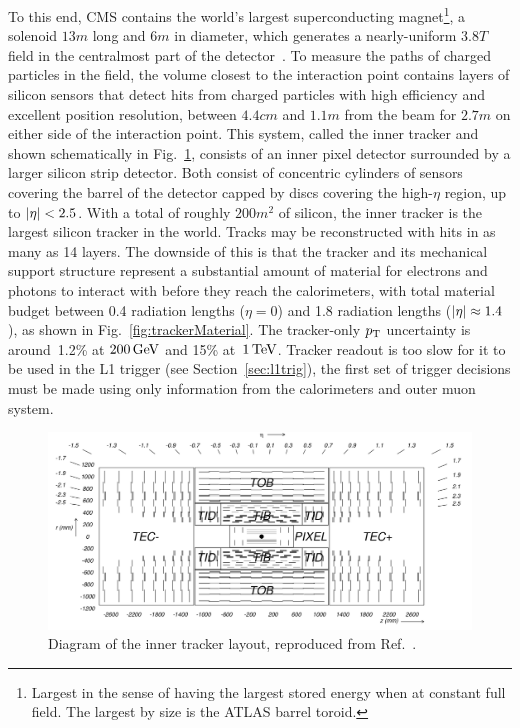 To this end, CMS contains the world's largest superconducting magnet\footnote{Largest in the sense of having the largest stored energy when at constant full field. The largest by size is the ATLAS barrel toroid.}, a solenoid $13\unit{m}$ long and $6\unit{m}$ in diameter, which generates a nearly-uniform $3.8\unit{T}$ field in the centralmost part of the detector~\cite{Campi:magnetTDR}.
To measure the paths of charged particles in the field, the volume closest to the interaction point contains layers of silicon sensors that detect hits from charged particles with high efficiency and excellent position resolution, between $4.4\unit{cm}$ and $1.1\unit{m}$ from the beam for $2.7\unit{m}$ on either side of the interaction point.
This system, called the inner tracker and shown schematically in Fig.~\ref{fig:tracker}, consists of an inner pixel detector surrounded by a larger silicon strip detector.
Both consist of concentric cylinders of sensors covering the barrel of the detector capped by discs covering the high-$\eta$ region, up to $\lvert \eta \rvert < 2.5$.
With a total of roughly $200\unit{m}^2$ of silicon, the inner tracker is the largest silicon tracker in the world.
Tracks may be reconstructed with hits in as many as 14 layers.
The downside of this is that the tracker and its mechanical support structure represent a substantial amount of material for electrons and photons to interact with before they reach the calorimeters, with total material budget between 0.4 radiation lengths ($\eta=0$) and 1.8 radiation lengths ($\lvert \eta \rvert \approx 1.4$), as shown in Fig.~\ref{fig:trackerMaterial}.
The tracker-only $p_\mathrm{T}$ uncertainty is around~1.2\% at $200\,\mathrm{Ge\hspace{-.08em}V}$ and 15\% at~$1\,\mathrm{Te\hspace{-.08em}V}$.
Tracker readout is too slow for it to be used in the L1 trigger (see Section~\ref{sec:l1trig}), the first set of trigger decisions must be made using only information from the calorimeters and outer muon system.

\begin{figure}[htbp]
  \centering
  \includegraphics[width=\textwidth]{experiment/tracker.png}
  \caption[Inner tracker layout]{
    Diagram of the inner tracker layout, reproduced from Ref.~\cite{Chatrchyan:2008zzk}.
  }\label{fig:tracker}
\end{figure}


